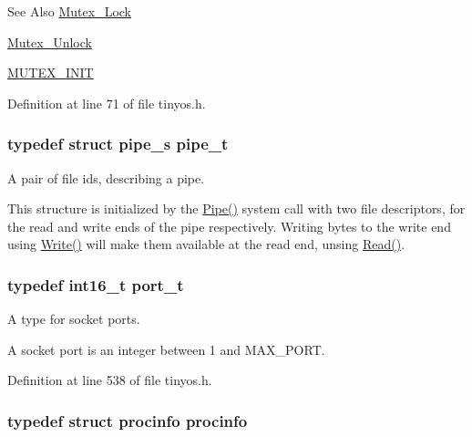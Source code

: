 \begin{DoxySeeAlso}{See Also}
\hyperlink{group__syscalls_ga1140be44df71d39edaf6a7262fb763ca}{Mutex\-\_\-\-Lock} 

\hyperlink{group__syscalls_ga0b98d0315d0931d0c28104c36dd559c9}{Mutex\-\_\-\-Unlock} 

\hyperlink{group__syscalls_ga96be0bfc33e7e113099c7546798bec99}{M\-U\-T\-E\-X\-\_\-\-I\-N\-I\-T} 
\end{DoxySeeAlso}


Definition at line 71 of file tinyos.\-h.

\hypertarget{group__syscalls_gad56b5ceaaf7d3ab88b4be7f622314dfb}{
\subsubsection[{pipe\-\_\-t}]{\setlength{\rightskip}{0pt plus 5cm}typedef struct {\bf pipe\-\_\-s}  {\bf pipe\-\_\-t}}}\label{group__syscalls_gad56b5ceaaf7d3ab88b4be7f622314dfb}


A pair of file ids, describing a pipe. 

This structure is initialized by the {\ttfamily \hyperlink{group__syscalls_gab6355ce54e047c31538ed5ed9108b5b3}{Pipe()}} system call with two file descriptors, for the read and write ends of the pipe respectively. Writing bytes to the write end using {\ttfamily \hyperlink{group__syscalls_gaf046f003fde24f79fb395c250137856c}{Write()}} will make them available at the read end, unsing {\ttfamily \hyperlink{group__syscalls_ga3e9dc545a789eb45b2d356eabbac3ee3}{Read()}}. \hypertarget{group__syscalls_ga13894e5a2ffd5febb7aeb90e87239d61}{
\subsubsection[{port\-\_\-t}]{\setlength{\rightskip}{0pt plus 5cm}typedef int16\-\_\-t {\bf port\-\_\-t}}}\label{group__syscalls_ga13894e5a2ffd5febb7aeb90e87239d61}


A type for socket ports. 

A socket port is an integer between 1 and {\ttfamily M\-A\-X\-\_\-\-P\-O\-R\-T}. 

Definition at line 538 of file tinyos.\-h.

\hypertarget{group__syscalls_ga9682d9066f643f8d18cff58fd3fb09b9}{
\subsubsection[{procinfo}]{\setlength{\rightskip}{0pt plus 5cm}typedef struct {\bf procinfo}  {\bf procinfo}}}\label{group__syscalls_ga9682d9066f643f8d18cff58fd3fb09b9}


